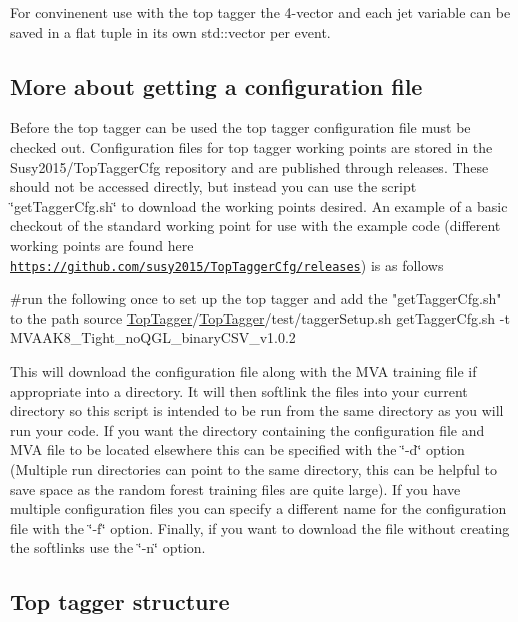 For convinenent use with the top tagger the 4-\/vector and each jet variable can be saved in a flat tuple in its own std\-::vector per event.

\subsection*{More about getting a configuration file}

Before the top tagger can be used the top tagger configuration file must be checked out. Configuration files for top tagger working points are stored in the Susy2015/\-Top\-Tagger\-Cfg repository and are published through releases. These should not be accessed directly, but instead you can use the script \char`\"{}get\-Tagger\-Cfg.\-sh\char`\"{} to download the working points desired. An example of a basic checkout of the standard working point for use with the example code (different working points are found here \href{https://github.com/susy2015/TopTaggerCfg/releases}{\tt https\-://github.\-com/susy2015/\-Top\-Tagger\-Cfg/releases}) is as follows


\begin{DoxyCode}
\textcolor{preprocessor}{#run the following once to set up the top tagger and add the "getTaggerCfg.sh" to the path}
\textcolor{preprocessor}{}source \hyperlink{classTopTagger}{TopTagger}/\hyperlink{classTopTagger}{TopTagger}/test/taggerSetup.sh
getTaggerCfg.sh -t MVAAK8\_Tight\_noQGL\_binaryCSV\_v1.0.2
\end{DoxyCode}


This will download the configuration file along with the M\-V\-A training file if appropriate into a directory. It will then softlink the files into your current directory so this script is intended to be run from the same directory as you will run your code. If you want the directory containing the configuration file and M\-V\-A file to be located elsewhere this can be specified with the \char`\"{}-\/d\char`\"{} option (Multiple run directories can point to the same directory, this can be helpful to save space as the random forest training files are quite large). If you have multiple configuration files you can specify a different name for the configuration file with the \char`\"{}-\/f\char`\"{} option. Finally, if you want to download the file without creating the softlinks use the \char`\"{}-\/n\char`\"{} option.

\subsection*{Top tagger structure}

